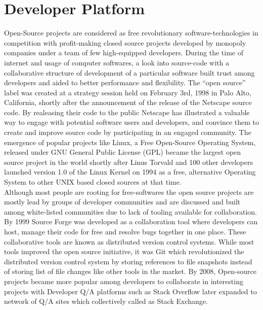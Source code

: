 \documentclass[conference]{IEEEtran}
\begin{document}
\section{\textbf{Developer Platform}}

Open-Source projects are considered as free revolutionary software-technologies in competition with profit-making closed source projects developed by monopoly companies under a team of few high-equipped developers. During the time of internet and usage of computer softwares, a look into source-code with a collaborative structure of development of a particular software built trust among developers and aided to better performance and flexibility. The “open source” label was created at a strategy session held on February 3rd, 1998 in Palo Alto, California, shortly after the announcement of the release of the Netscape source code. By realeasing their code to the public Netscape has illustrated a valuable way to engage with potential software users and developers, and convince them to create and improve source code by participating in an engaged community. The emergence of popular projects like Linux, a Free Open-Source Operating System, released under GNU General Public License (GPL) became the largest open source project in the world shortly after Linus Torvald and 100 other developers launched version 1.0 of the Linux Kernel  on 1994 as a free, alternative Operating System to other UNIX based closed sources at that time.\\

Although most people are rooting for free-softwares the open source projects are mostly lead by groups of developer communities and are discussed and built among white-listed communities due to lack of tooling available for collaboration. By 1999 Source Forge was developed as a collaboration tool where developers can host, manage their code for free and resolve bugs together in one place. These collaborative tools are known as distributed version control systems. While most tools improved the open source initiative, it was Git which revolutionized the distributed version control system by storing references to file snapshots instead of storing list of file changes like other tools in the market. By 2008, Open-source projects became more popular among developers to collaborate in interesting projects with Developer Q/A platforms such as Stack Overflow later expanded to network of Q/A sites which collectively called as Stack Exchange.\\
\end{document}
